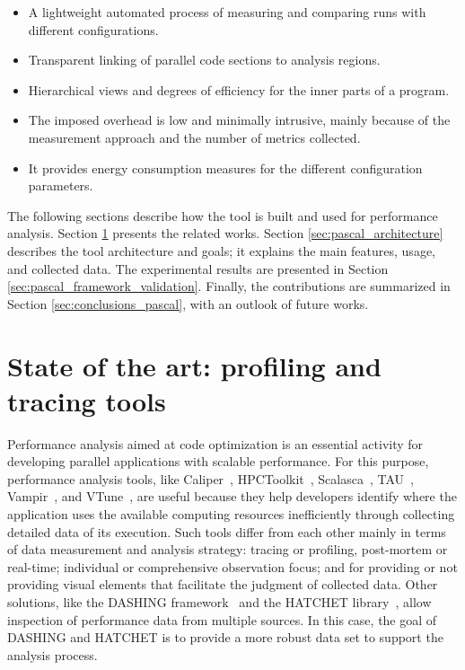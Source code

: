\begin{itemize}
	\item A lightweight automated process of measuring and comparing runs with different configurations.
	\item Transparent linking of parallel code sections to analysis regions.
	\item Hierarchical views and degrees of efficiency for the inner parts of a program.
	\item The imposed overhead is low and minimally intrusive, mainly because of the measurement approach and the number of metrics collected.
	\item It provides energy consumption measures for the different configuration parameters. 
\end{itemize}

The following sections describe how the tool is built and used for performance analysis. Section \ref{sec:state_of_the_art_profiling_and_tracing_tools} presents the related works. Section \ref{sec:pascal_architecture} describes the tool architecture and goals; it explains the main features, usage, and collected data. The experimental results are presented in Section \ref{sec:pascal_framework_validation}. Finally, the contributions are summarized in Section \ref{sec:conclusions_pascal}, with an outlook of future works.

\section{State of the art: profiling and tracing tools} \label{sec:state_of_the_art_profiling_and_tracing_tools}

Performance analysis aimed at code optimization is an essential activity for developing parallel applications with scalable performance. For this purpose, performance analysis tools, like Caliper~\cite{Boehme2016}, HPCToolkit~\cite{Adhianto2010}, Scalasca~\cite{Geimer2010}, TAU~\cite{Shende2006}, Vampir~\cite{Weber2019}, and VTune~\cite{Intel2021Vtune}, are useful because they help developers identify where the application uses the available computing resources inefficiently through collecting detailed data of its execution. Such tools differ from each other mainly in terms of data measurement and analysis strategy: tracing or profiling, post-mortem or real-time; individual or comprehensive observation focus; and for providing or not providing visual elements that facilitate the judgment of collected data. Other solutions, like the DASHING framework~\cite{Islam2019} and the HATCHET library~\cite{Brink2020}, allow inspection of performance data from multiple sources. In this case, the goal of DASHING and HATCHET is to provide a more robust data set to support the analysis process.

